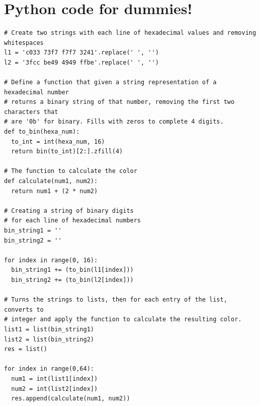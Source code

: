 \documentclass{article}
\begin{document}
\section*{Python code for dummies!}

\begin{lstlisting}
# Create two strings with each line of hexadecimal values and removing whitespaces
l1 = 'c033 73f7 f7f7 3241'.replace(' ', '')
l2 = '3fcc be49 4949 ffbe'.replace(' ', '')

# Define a function that given a string representation of a hexadecimal number
# returns a binary string of that number, removing the first two characters that
# are '0b' for binary. Fills with zeros to complete 4 digits.
def to_bin(hexa_num):
  to_int = int(hexa_num, 16)
  return bin(to_int)[2:].zfill(4)

# The function to calculate the color
def calculate(num1, num2):
  return num1 + (2 * num2)
  
# Creating a string of binary digits
# for each line of hexadecimal numbers
bin_string1 = ''
bin_string2 = ''

for index in range(0, 16):
  bin_string1 += (to_bin(l1[index]))
  bin_string2 += (to_bin(l2[index]))

# Turns the strings to lists, then for each entry of the list, converts to 
# integer and apply the function to calculate the resulting color.
list1 = list(bin_string1)
list2 = list(bin_string2)
res = list()

for index in range(0,64):
  num1 = int(list1[index])
  num2 = int(list2[index])
  res.append(calculate(num1, num2))
\end{lstlisting}
\end{document}
